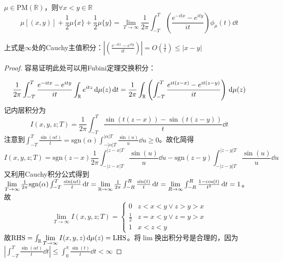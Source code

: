 \documentclass{ctexart}
\begin{document}
\begin{Thm}
  $\mu\in \mathrm{PM}(\mathbb{R})$，则$\forall x<y \in \mathbb{R}$
\begin{equation}
  \mu[(x,y)]+\frac{1}{2}\mu\{x\}+\frac{1}{2}\mu\{y\}=\lim_{T\to\infty}\frac{1}{2\pi}\int_{-T}^T \left( \frac{e^{-itx}-e^{ity}}{it} \right)\phi_{\mu}(t)\dd t
  \end{equation}
\end{Thm}
\begin{Rmk}
  上式是$\infty$处的Cauchy主值积分：$|\left( \frac{e^{-itx}-e^{ity}}{it} \right)|=O(\frac{1}{t})\leq |x-y|$
\end{Rmk}
\begin{proof}
  容易证明此处可以用Fubini定理交换积分：
  
\begin{equation}
\frac{1}{2\pi}\int_{-T}^T \frac{e^{-itx}-e^{ity}}{it}\int_{\mathbb{R}}e^{itz}\,\mathrm{d}\mu(z)\,\mathrm{d} t =\frac{1}{2\pi}\int_{\mathbb{R}}\left( \int_{-T}^T \frac{e^{it(z-x)}-e^{it(z-y)}}{it} \right)\,\mathrm{d}\mu(z)
\end{equation}
记内层积分为
\begin{equation}
I(x,y,z;T)=\frac{1}{2\pi}\int_{-T}^T \frac{\sin(t(z-x))-\sin(t(z-y))}{t}\dd t
\end{equation}
注意到$\int_{-T}^T \frac{\sin(\alpha t)}{t}= \mathrm{sgn}(\alpha)\int_{-|\alpha|T}^{|\alpha| T}\frac{\sin(u)}{u}\dd u \geq 0$。故化简得
\begin{equation}
I(x,y,z;T)= \mathrm{sgn}(z-x) \frac{1}{2\pi}\int_{-|z-x|T}^{|z-x|T} \frac{\sin(u)}{u}\dd u- \mathrm{sgn}(z-y) \int_{-|z-y|T}^{|z-y|T} \frac{\sin(u)}{u}\dd u
\end{equation}
又利用Cauchy积分公式得到$\lim\limits_{T\to\infty} \frac{1}{2\pi} \mathrm{sgn}(\alpha)\int_{-T}^T \frac{\sin(\alpha t)}{t}\,\mathrm{d} t=\lim\limits_{\mathbb{R}\to\infty} \frac{1}{2\pi}\int_{-R}^R \frac{\sin(t)}{t}\,\mathrm{d} t=\lim\limits_{R\to\infty}\int_{-R}^R \frac{1-\cos(t)}{t^2}\,\mathrm{d} t=1$。故 
\begin{equation}
\lim_{T\to\infty}I(x,y,z;T)=
\begin{cases}
  0& z<x<y \lor z>y>x\\
  \frac{1}{2} & z=x<y \lor z=y>x\\
  1 & x<z<y
\end{cases}
\end{equation}
故$\mathrm{RHS}=\int_{\mathbb{R}}\lim\limits_{T\to\infty}I(x,y,z)\,\mathrm{d}\mu(z)= \mathrm{LHS}$。将$\lim$换出积分号是合理的，因为$|\int_{-T}^T \frac{\sin(\alpha t)}{t}\dd t|\leq \int_{0}^{\pi} \frac{\sin(t)}{t}\dd t<\infty$
\end{proof}
\end{document}
